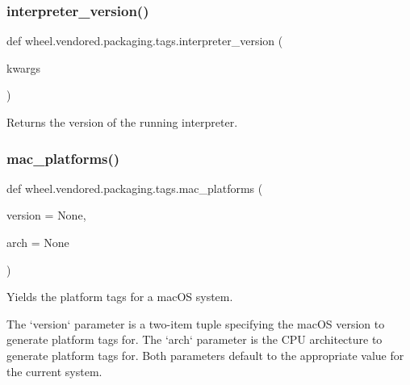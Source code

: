 \subsubsection{\texorpdfstring{interpreter\+\_\+version()}{interpreter\_version()}}
{\footnotesize\ttfamily def wheel.\+vendored.\+packaging.\+tags.\+interpreter\+\_\+version (\begin{DoxyParamCaption}\item[{}]{kwargs }\end{DoxyParamCaption})}

\begin{DoxyVerb}Returns the version of the running interpreter.
\end{DoxyVerb}
 \mbox{\label{namespacewheel_1_1vendored_1_1packaging_1_1tags_a7a425b4ec7e87900a12436639b659621}} 
\subsubsection{\texorpdfstring{mac\+\_\+platforms()}{mac\_platforms()}}
{\footnotesize\ttfamily def wheel.\+vendored.\+packaging.\+tags.\+mac\+\_\+platforms (\begin{DoxyParamCaption}\item[{}]{version = {\ttfamily None},  }\item[{}]{arch = {\ttfamily None} }\end{DoxyParamCaption})}

\begin{DoxyVerb}Yields the platform tags for a macOS system.

The `version` parameter is a two-item tuple specifying the macOS version to
generate platform tags for. The `arch` parameter is the CPU architecture to
generate platform tags for. Both parameters default to the appropriate value
for the current system.
\end{DoxyVerb}
 \mbox{\label{namespacewheel_1_1vendored_1_1packaging_1_1tags_adad8fe5985f2db710719817409806d4e}} 
